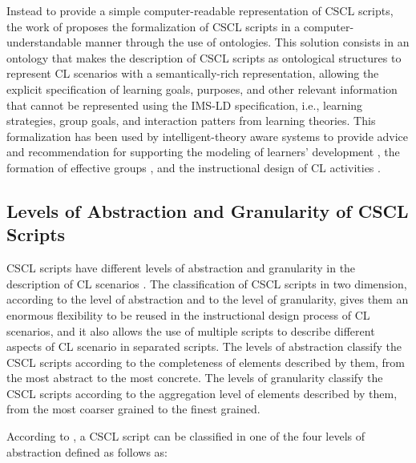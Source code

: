 Instead to provide a simple computer-readable representation of CSCL scripts, the work of  proposes the formalization of CSCL scripts in a computer-understandable manner through the use of ontologies.
This solution consists in an ontology that makes the description of CSCL scripts as ontological structures to represent CL scenarios with a semantically-rich representation, allowing the explicit specification of learning goals, purposes, and other relevant information that cannot be represented using the IMS-LD specification, i.e., learning strategies, group goals, and interaction patters from learning theories.
This formalization has been used by intelligent-theory aware systems to provide advice and recommendation for supporting the modeling of learners' development \cite{InabaIkedaMizoguchi2003}, the formation of effective groups \cite{IsotaniMizoguchi2008a}, and the instructional design of CL activities \cite{IsotaniMizoguchiIsotaniCapeliIsotanideAlbuquerqueBittencourtJaques2013}.

\subsection{Levels of Abstraction and Granularity of CSCL Scripts}
\label{sec:level-of-abstraction-and-granularity-of-cscl-scripts}

CSCL scripts have different levels of abstraction and granularity in the description of CL scenarios \cite{Dillenbourg2002, DillenbourgJermann2007, Villasclaras-FernandezIsotaniHayashiMizoguchi2009}.
The classification of CSCL scripts in two dimension, according to the level of abstraction and to the level of granularity, gives them an enormous flexibility to be reused in the instructional design process of CL scenarios, and it also allows the use of multiple scripts to describe different aspects of CL scenario in separated scripts.
The levels of abstraction classify the CSCL scripts according to the completeness of elements described by them, from the most abstract to the most concrete.
The levels of granularity classify the CSCL scripts according to the aggregation level of elements described by them, from the most coarser grained to the finest grained.

According to , a CSCL script can be classified in one of the four levels of abstraction defined as follows as:

